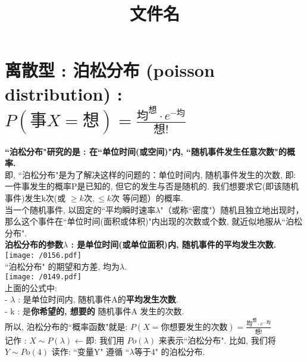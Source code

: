 \documentclass[UTF8]{ctexart}
\title{文件名}
\begin{document}
	\tableofcontents %
	\date{} %
	\maketitle  %
	
\section{离散型 : 泊松分布 (poisson distribution) : \\  $	P\left( \text{事}X=\text{想} \right) =\frac{\text{均}^{\text{想}}\cdot e^{-\text{均}}}{\text{想!}}	$}
	
	\textbf{``泊松分布"研究的是 : 在``单位时间(或空间)"内, ``随机事件发生任意次数"的概率.} \\
	
	即, ``泊松分布"是为了解决这样的问题的：单位时间内, 随机事件发生的次数, 即: 一件事发生的概率P是已知的, 但它的发生与否是随机的. 我们想要求它(即该随机事件)发生k次(或 $\geq k \text{次}, \leq k \text{次}$  等问题）的概率. \\
	
	当一个随机事件, 以固定的``平均瞬时速率$\lambda$"（或称``密度"）随机且独立地出现时，那么这个事件在``单位时间(面积或体积)"内出现的次数或个数, 就近似地服从``泊松分布". \\
	\textbf{泊松分布的参数$\lambda$ : 是单位时间(或单位面积)内, 随机事件的平均发生次数.} \\
	
	\texttt{[image: /0156.pdf]} \\
	
	``泊松分布" 的期望和方差, 均为$\lambda$. \\
	
	
	
	\texttt{[image: /0149.pdf]} \\
	上面的公式中:  \\
	- $\lambda$ : 是单位时间内, 随机事件A的\textbf{平均发生次数}. \\
	- k : 是\textbf{你希望的, 想要的} 随机事件A 发生的次数. \\
	
	
	所以, 泊松分布的``概率函数"就是: $\boxed{
		P\left(X=\text{你想要发生的次数} \right) =\frac{\text{均}^{\text{想}}\cdot e^{-\text{均}}}{\text{想!}}
	}$ \\

	记作 : $\boxed{	X \sim P(\lambda)}$	← 	即: 我们用 $Po(\lambda)$ 来表示``泊松分布". 比如, 我们将$ Y \sim Po(4)$ 读作: ``变量Y" 遵循 ``$\lambda$等于4" 的泊松分布. \\
\end{document}
